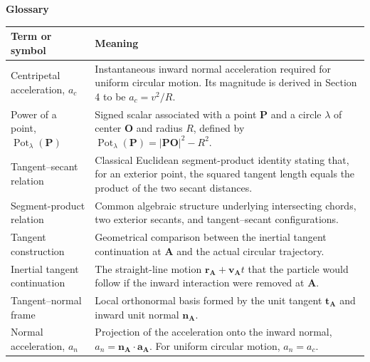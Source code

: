 \documentclass[preprint,12pt,3p,nopreprintline]{elsarticle}
\newcommand{\pt}[1]{\mathbf{#1}}
\newcommand{\seglen}[1]{\lvert\mathbf{#1}\rvert}
\DeclareMathOperator{\Pot}{Pot}
\numberwithin{equation}{section}
\theoremstyle{remark}
\begin{document}
{}

{\LARGE\bfseries Glossary}

\vspace{1.4em}

\renewcommand{\arraystretch}{1.18}
\setlength{\tabcolsep}{6pt}

\begin{tabularx}{\textwidth}{@{}>{\raggedright\arraybackslash}p{}X@{}}
\toprule
\textbf{Term or symbol} & \textbf{Meaning} \\
\midrule

Centripetal acceleration, $a_c$ &
Instantaneous inward normal acceleration required for uniform circular motion. Its magnitude is derived in Section 4 to be $ a_c = v^2/R$. \\

Power of a point, $\Pot_{\lambda}(\pt{P})$ &
Signed scalar associated with a point $\pt{P}$ and a circle $\lambda$ of center $\pt{O}$ and radius $R$, defined by $\Pot_{\lambda}(\pt{P})=\seglen{PO}^{2}-R^2$. \\

Tangent--secant relation &
Classical Euclidean segment-product identity stating that, for an exterior point, the squared tangent length equals the product of the two secant distances. \\

Segment-product relation &
Common algebraic structure underlying intersecting chords, two exterior secants, and tangent--secant configurations. \\

Tangent construction &
Geometrical comparison between the inertial tangent continuation at $\pt{A}$ and the actual circular trajectory. \\

Inertial tangent continuation &
The straight-line motion $\mathbf{r}_{\pt{A}}+\mathbf{v}_{\pt{A}}t$ that the particle would follow if the inward interaction were removed at $\pt{A}$. \\

Tangent--normal frame &
Local orthonormal basis formed by the unit tangent $\mathbf{t}_{\pt{A}}$ and inward unit normal $\mathbf{n}_{\pt{A}}$. \\

Normal acceleration, $a_n$ &
Projection of the acceleration onto the inward normal, $a_n=\mathbf{n}_{\pt{A}}\!\cdot\!\mathbf{a}_{\pt{A}}$. For uniform circular motion, $a_n=a_c$. \\


\end{tabularx}
\end{document}
